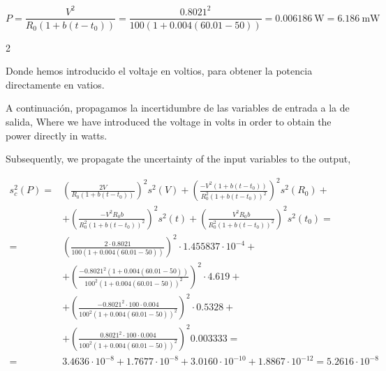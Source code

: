 \begin{equation*}
P = \frac{V^2}{R_0\left(1+b(t-t_0)\right)}=\frac{0.8021^2}{100\left(1+0.004(60.01-50)\right)} =  0.006186\ \mathrm{W} = 6.186\ \mathrm{mW}
\end{equation*}

\begin{paracol}{2}

Donde hemos introducido el voltaje en voltios, para  obtener la potencia directamente en vatios.

A continuación, propagamos la incertidumbre de las variables de entrada a la de salida,
\switchcolumn
Where we have introduced the voltage in volts in order to obtain the power directly in watts.

Subsequently, we propagate the uncertainty of the input variables to the output, 
\end{paracol}
\begin{align*}
s_c^2(P) =& \left(\frac{2V}{R_0\left(1+b(t-t_0)\right)}\right)^2 s^2(V)+ \left(\frac{-V^2\left(1+b(t-t_0)\right)}{R_0^2\left(1+b(t-t_0)\right)^2}\right)^2 s^2(R_0)+\\
&+ \left(\frac{-V^2R_0b}{R_0^2\left(1+b(t-t_0)\right)^2}\right)^2 s^2(t)+\left(\frac{V^2R_0b}{R_0^2\left(1+b(t-t_0)\right)^2}\right)^2 s^2(t_0)=\\
=& \left(\frac{2 \cdot 0.8021}{100\left(1+0.004(60.01-50)\right)}\right)^2 \cdot 1.455837\cdot10^{-4} +\\
&+ \left(\frac{- 0.8021^2\left(1+0.004(60.01-50)\right)}{100^2\left(1+0.004(60.01-50)\right)^2}\right)^2 \cdot 4.619+\\
&+ \left(\frac{- 0.8021^2\cdot100\cdot0.004}{100^2\left(1+0.004(60.01-50)\right)^2}\right)^2\cdot 0.5328 +\\
&+\left(\frac{0.8021^2\cdot100\cdot0.004}{100^2\left(1+0.004(60.01-50)\right)^2}\right)^2 0.003333=\\
=&3.4636\cdot10^{-8} + 1.7677\cdot10^{-8} + 3.0160\cdot10^{-10} + 1.8867\cdot10^{-12} =  5.2616\cdot 10^{-8}
\end{align*} 

